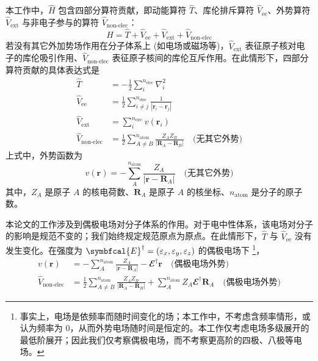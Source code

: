 本工作中，$\hat H$ 包含四部分算符贡献，即动能算符 $\hat T$、库伦排斥算符 $\hat V_\mathrm{ee}$、外势算符 $\hat V_\mathrm{ext}$ 与非电子参与的算符 $\hat V_\text{non-elec}$：
\begin{equation}
  \hat H = \hat T + \hat V_\mathrm{ee} + \hat V_\mathrm{ext} + \hat V_\text{non-elec}
\end{equation}
若没有其它外加势场作用在分子体系上 (如电场或磁场等)，$\hat V_\mathrm{ext}$ 表征原子核对电子的库伦吸引作用、$\hat V_\text{non-elec}$ 表征原子核间的库伦互斥作用。在此情形下，四部分算符贡献的具体表达式是
\begin{align}
  \hat T &= - \frac{1}{2} \sum_i^{n_\mathrm{elec}} \nabla_i^2 \\
  \hat V_\mathrm{ee} &= \frac{1}{2} \sum_{i \neq j}^{n_\mathrm{elec}} \frac{1}{| \bm{r}_i - \bm{r}_j |} \\
  \hat V_\mathrm{ext} &= \sum_{i}^{n_\mathrm{elec}} v (\bm{r}_i) \\
  \hat V_\text{non-elec} &= \frac{1}{2} \sum_{A \neq B}^{n_\mathrm{atom}} \frac{Z_A Z_B}{| \bm{R}_A  - \bm{R}_B |} \quad \text{(无其它外势)}
\end{align}
上式中，外势函数为
\begin{equation}
  v (\bm{r}) = - \sum_{A}^{n_\mathrm{atom}} \frac{Z_A}{| \bm{r} - \bm{R}_A |} \quad \text{(无其它外势)}
\end{equation}
其中，$Z_A$ 是原子 $A$ 的核电荷数、$\bm{R}_A$ 是原子 $A$ 的核坐标、$n_\mathrm{atom}$ 是分子的原子数。

本论文的工作涉及到偶极电场对分子体系的作用。对于电中性体系，该电场对分子的影响是规范不变的；我们始终规定规范原点为原点。在此情形下，$\hat T$ 与 $\hat V_\mathrm{ee}$ 没有发生变化。在强度为 $\symbfcal{E}^\dagger = (\varepsilon_x, \varepsilon_y, \varepsilon_z)$ 的偶极电场下 \cite{Atkins-Friedman.Oxford.2011}\footnote{事实上，电场是依频率而随时间变化的场；本工作中，不考虑含频率情形，或认为频率为 0，从而外势电场随时间是恒定的。本工作仅考虑电场多级展开的最低阶展开；因此我们仅考察偶极电场，而不考察更高阶的四极、八极等电场。}，
\begin{align}
  v (\bm{r}) &= - \sum_{A}^{n_\mathrm{atom}} \frac{Z_A}{| \bm{r} - \bm{R}_A |} - \mathbfcal{E}^\dagger \bm{r} \quad \text{(偶极电场外势)} \\
  \hat V_\text{non-elec} &= \frac{1}{2} \sum_{A \neq B}^{n_\mathrm{atom}} \frac{Z_A Z_B}{| \bm{R}_A  - \bm{R}_B |} + \sum_{A}^{n_\mathrm{atom}} Z_A \mathbfcal{E}^\dagger \bm{R}_A \quad \text{(偶极电场外势)}
\end{align}

